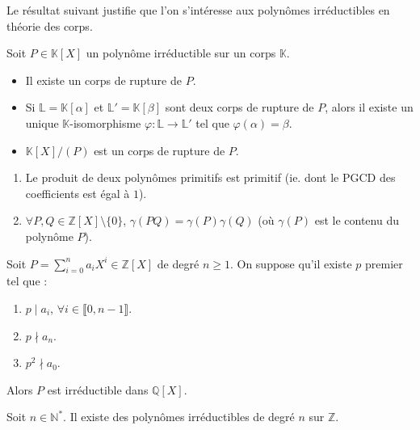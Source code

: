 	Le résultat suivant justifie que l'on s'intéresse aux polynômes irréductibles en théorie des corps.


	\begin{theorem}
		Soit $P \in \mathbb{K}[X]$ un polynôme irréductible sur un corps $\mathbb{K}$.
		\begin{itemize}
			\item Il existe un corps de rupture de $P$.
			\item Si $\mathbb{L} = \mathbb{K}[\alpha]$ et $\mathbb{L}' = \mathbb{K}[\beta]$ sont deux corps de rupture de $P$, alors il existe un unique $\mathbb{K}$-isomorphisme $\varphi : \mathbb{L} \rightarrow \mathbb{L}'$ tel que $\varphi(\alpha) = \beta$.
			\item $\mathbb{K}[X]/(P)$ est un corps de rupture de $P$.
		\end{itemize}
	\end{theorem}


	\begin{lemma}[Gauss]
		\begin{enumerate}[label=(\roman*)]
			\item Le produit de deux polynômes primitifs est primitif (ie. dont le PGCD des coefficients est égal à $1$).
			\item $\forall P, Q \in \mathbb{Z}[X] \setminus \{ 0 \}$, $\gamma(PQ) = \gamma(P) \gamma(Q)$ (où $\gamma(P)$ est le contenu du polynôme $P$).
		\end{enumerate}
	\end{lemma}


	\begin{theorem}
		Soit $P = \sum_{i=0}^n a_i X^i \in \mathbb{Z}[X]$ de degré $n \geq 1$. On suppose qu'il existe $p$ premier tel que :
		\begin{enumerate}[label=(\roman*)]
			\item $p \mid a_i$, $\forall i \in \llbracket 0, n-1 \rrbracket$.
			\item $p \nmid a_n$.
			\item $p^2 \nmid a_0$.
		\end{enumerate}
		Alors $P$ est irréductible dans $\mathbb{Q}[X]$.
	\end{theorem}


	\begin{application}
		Soit $n \in \mathbb{N}^*$. Il existe des polynômes irréductibles de degré $n$ sur $\mathbb{Z}$.
	\end{application}

